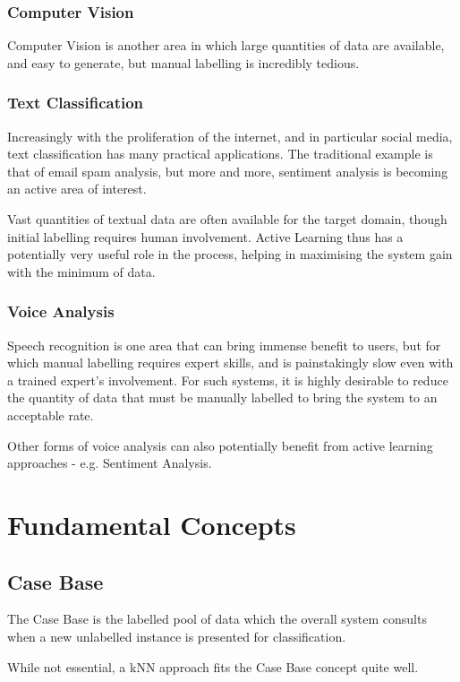 \documentclass[a4paper,11pt]{report}
\begin{document}
\subsubsection{Computer Vision}
Computer Vision is another area in which large quantities of data are available, and easy to generate, but manual labelling is incredibly tedious.

\subsubsection{Text Classification}
Increasingly with the proliferation of the internet, and in particular social media, text classification has many practical applications. The traditional example is that of email spam analysis, but more and more, sentiment analysis is becoming an active area of interest.

Vast quantities of textual data are often available for the target domain, though initial labelling requires human involvement. Active Learning thus has a potentially very useful role in the process, helping in maximising the system gain with the minimum of data.

\subsubsection{Voice Analysis}

Speech recognition is one area that can bring immense benefit to users, but for which manual labelling requires expert skills, and is painstakingly slow even with a trained expert's involvement. For such systems, it is highly desirable to reduce the quantity of data that must be manually labelled to bring the system to an acceptable rate.

Other forms of voice analysis can also potentially benefit from active learning approaches - e.g. Sentiment Analysis.

\section{Fundamental Concepts}
\subsection{Case Base}
The Case Base is the labelled pool of data which the overall system consults when a new unlabelled instance is presented for classification.

While not essential, a kNN approach fits the Case Base concept quite well.
\end{document}
